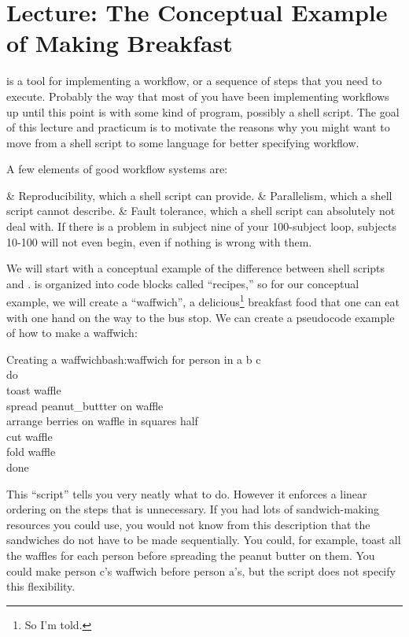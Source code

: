 
\section{Lecture: The Conceptual Example of Making Breakfast}

\maken{} is a tool for implementing a workflow, or a sequence of steps that you need to execute. Probably the way that most of you have been implementing workflows up until this point is with some kind of program, possibly a shell script. The goal of this lecture and practicum is to motivate the reasons why you might want to move from a shell script to some language for better specifying workflow.


A few elements of good workflow systems are:
\begin{easylist}[itemize]
	& Reproducibility, which a shell script can provide.
	& Parallelism, which a shell script cannot describe.
	& Fault tolerance, which a shell script can absolutely not deal with. If there is a problem in subject nine of your 100-subject loop, subjects 10-100 will not even begin, even if nothing is wrong with them.
\end{easylist}

We will start with a conceptual example of the difference between shell scripts and \maken{}. \maken{} is organized into code blocks called ``recipes,'' so for our conceptual example, we will create a ``waffwich'', a delicious\footnote{So I'm told.} breakfast food that one can eat with one hand on the way to the bus stop. We can create a pseudocode   example of how to make a waffwich:
\begin{bash}{Creating a waffwich}{bash:waffwich}
	for person in a b c \\
	do \\
	toast waffle \\
	spread peanut_buttter \dd on waffle \\
	arrange berries \dd on waffle \dd in squares \dd half \\
	cut waffle \\ 
	fold waffle \\
	done
\end{bash}

This ``script'' tells you very neatly what to do. However it enforces a linear ordering on the steps that is unnecessary. If you had lots of sandwich-making resources you could use, you would not know from this description that the sandwiches do not have to be made sequentially. You could, for example, toast all the waffles for each person before spreading the peanut butter on them. You could make person c's waffwich before person a's, but the script does not specify this flexibility.

